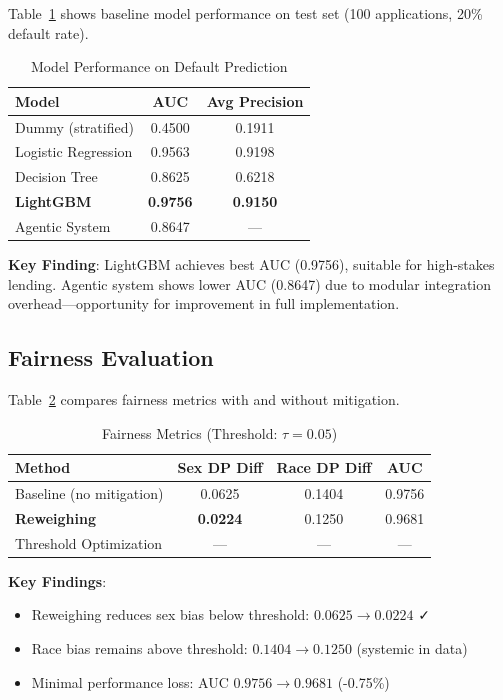 \documentclass[11pt]{article}
\begin{document}
Table~\ref{tab:performance} shows baseline model performance on test set (100 applications, 20\% default rate).

\begin{table}[h]
\centering
\caption{Model Performance on Default Prediction}
\label{tab:performance}
\begin{tabular}{lcc}
\toprule
\textbf{Model} & \textbf{AUC} & \textbf{Avg Precision} \\
\midrule
Dummy (stratified) & 0.4500 & 0.1911 \\
Logistic Regression & 0.9563 & 0.9198 \\
Decision Tree & 0.8625 & 0.6218 \\
\textbf{LightGBM} & \textbf{0.9756} & \textbf{0.9150} \\
\midrule
Agentic System & 0.8647 & --- \\
\bottomrule
\end{tabular}
\end{table}

\textbf{Key Finding}: LightGBM achieves best AUC (0.9756), suitable for high-stakes lending. Agentic system shows lower AUC (0.8647) due to modular integration overhead---opportunity for improvement in full implementation.

\subsection{Fairness Evaluation}

Table~\ref{tab:fairness} compares fairness metrics with and without mitigation.

\begin{table}[h]
\centering
\caption{Fairness Metrics (Threshold: $\tau = 0.05$)}
\label{tab:fairness}
\begin{tabular}{lccc}
\toprule
\textbf{Method} & \textbf{Sex DP Diff} & \textbf{Race DP Diff} & \textbf{AUC} \\
\midrule
Baseline (no mitigation) & 0.0625 & 0.1404 & 0.9756 \\
\textbf{Reweighing} & \textbf{0.0224} & 0.1250 & 0.9681 \\
Threshold Optimization & --- & --- & --- \\
\bottomrule
\end{tabular}
\end{table}

\textbf{Key Findings}:
\begin{itemize}
    \item Reweighing reduces sex bias below threshold: $0.0625 \rightarrow 0.0224$ ✓
    \item Race bias remains above threshold: $0.1404 \rightarrow 0.1250$ (systemic in data)
    \item Minimal performance loss: AUC $0.9756 \rightarrow 0.9681$ (-0.75\%)
\end{itemize}
\end{document}
